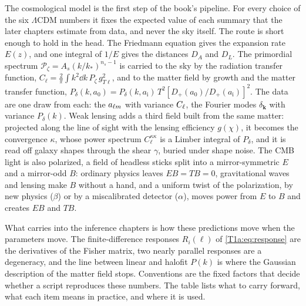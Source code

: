 The cosmological model is the first step of the book's pipeline. For every choice of the six $\Lambda$CDM numbers it fixes the expected value of each summary that the later chapters estimate from data, and never the sky itself. The route is short enough to hold in the head. The Friedmann equation gives the expansion rate $E(z)$, and one integral of $1/E$ gives the distances $D_A$ and $D_L$. The primordial spectrum $\mathcal P_\zeta=A_s(k/k_*)^{n_s-1}$ is carried to the sky by the radiation transfer function, $C_\ell=\frac2\pi\int k^2\dd k\,P_\zeta\,g_{T\ell}^2$, and to the matter field by growth and the matter transfer function, $P_\delta(k,a_0)=P_\delta(k,a_{\mathrm i})\,T^2[D_+(a_0)/D_+(a_{\mathrm i})]^2$. The data are one draw from each: the $a_{\ell m}$ with variance $C_\ell$, the Fourier modes $\delta_{\bm k}$ with variance $P_\delta(k)$. Weak lensing adds a third field built from the same matter: projected along the line of sight with the lensing efficiency $g(\chi)$, it becomes the convergence $\kappa$, whose power spectrum $C_\ell^{\kappa\kappa}$ is a Limber integral of $P_\delta$, and it is read off galaxy shapes through the shear $\gamma$, buried under shape noise. The CMB light is also polarized, a field of headless sticks split into a mirror-symmetric $E$ and a mirror-odd $B$: ordinary physics leaves $EB=TB=0$, gravitational waves and lensing make $B$ without a hand, and a uniform twist of the polarization, by new physics ($\beta$) or by a miscalibrated detector ($\alpha$), moves power from $E$ to $B$ and creates $EB$ and $TB$.

What carries into the inference chapters is how these predictions move when the parameters move. The finite-difference responses $R_i(\ell)$ of \cref{T1a:eq:response} are the derivatives of the Fisher matrix, two nearly parallel responses are a degeneracy, and the line between linear and halofit $P(k)$ is where the Gaussian description of the matter field stops. Conventions are the fixed factors that decide whether a script reproduces these numbers. The table lists what to carry forward, what each item means in practice, and where it is used.

